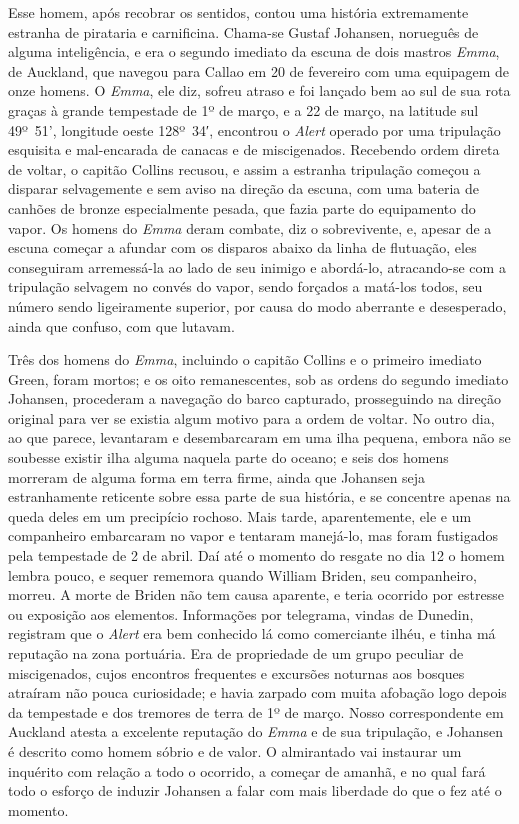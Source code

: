 \begin{pages}
\begin{Rightside}
Esse homem, após recobrar os sentidos, contou uma história extremamente
estranha de pirataria e carnificina. Chama-se Gustaf Johansen, norueguês
de alguma inteligência, e era o segundo imediato da escuna de dois
mastros \emph{Emma}, de Auckland, que navegou para Callao em 20 de
fevereiro com uma equipagem de onze homens. O \emph{Emma}, ele diz,
sofreu atraso e foi lançado bem ao sul de sua rota graças à grande
tempestade de 1º de março, e a 22 de março, na
latitude sul 49º~51', longitude
oeste 128º~34′, encontrou o \emph{Alert} operado por uma tripulação
esquisita e mal-encarada de canacas e de miscigenados. Recebendo ordem
direta de voltar, o capitão Collins recusou, e assim a estranha
tripulação começou a disparar selvagemente e sem aviso na direção da
escuna, com uma bateria de canhões de bronze especialmente pesada, que
fazia parte do equipamento do vapor. Os homens do \emph{Emma} deram
combate, diz o sobrevivente, e, apesar de a escuna começar a afundar com
os disparos abaixo da linha de flutuação, eles conseguiram arremessá-la
ao lado de seu inimigo e abordá-lo, atracando-se com a tripulação
selvagem no convés do vapor, sendo forçados a matá-los todos, seu número
sendo ligeiramente superior, por causa do modo aberrante e desesperado,
ainda que confuso, com que lutavam.

Três dos homens do \emph{Emma}, incluindo o capitão Collins e o primeiro
imediato Green, foram mortos; e os oito remanescentes, sob as ordens do
segundo imediato Johansen, procederam a navegação do barco capturado,
prosseguindo na direção original para ver se existia algum motivo para a
ordem de voltar. No outro dia, ao que parece, levantaram e desembarcaram
em uma ilha pequena, embora não se soubesse existir ilha alguma naquela
parte do oceano; e seis dos homens morreram de alguma forma em terra
firme, ainda que Johansen seja estranhamente reticente sobre essa parte
de sua história, e se concentre apenas na queda deles em um precipício
rochoso. Mais tarde, aparentemente, ele e um companheiro embarcaram no
vapor e tentaram manejá-lo, mas foram fustigados pela tempestade de 2 de
abril. Daí até o momento do resgate no dia 12 o homem lembra pouco, e
sequer rememora quando William Briden, seu companheiro, morreu. A morte
de Briden não tem causa aparente, e teria ocorrido por estresse ou
exposição aos elementos. Informações por telegrama, vindas de Dunedin,
registram que o \emph{Alert} era bem conhecido lá como comerciante
ilhéu, e tinha má reputação na zona portuária. Era de propriedade de um
grupo peculiar de miscigenados, cujos encontros frequentes e excursões
noturnas aos bosques atraíram não pouca curiosidade; e havia zarpado com
muita afobação logo depois da tempestade e dos tremores de terra de
1º de março. Nosso correspondente em Auckland
atesta a excelente reputação do \emph{Emma} e de sua tripulação, e
Johansen é descrito como homem sóbrio e de valor. O almirantado vai
instaurar um inquérito com relação a todo o ocorrido, a começar de
amanhã, e no qual fará todo o esforço de induzir Johansen a falar com
mais liberdade do que o fez até o momento.


\end{Rightside}
\end{pages}
